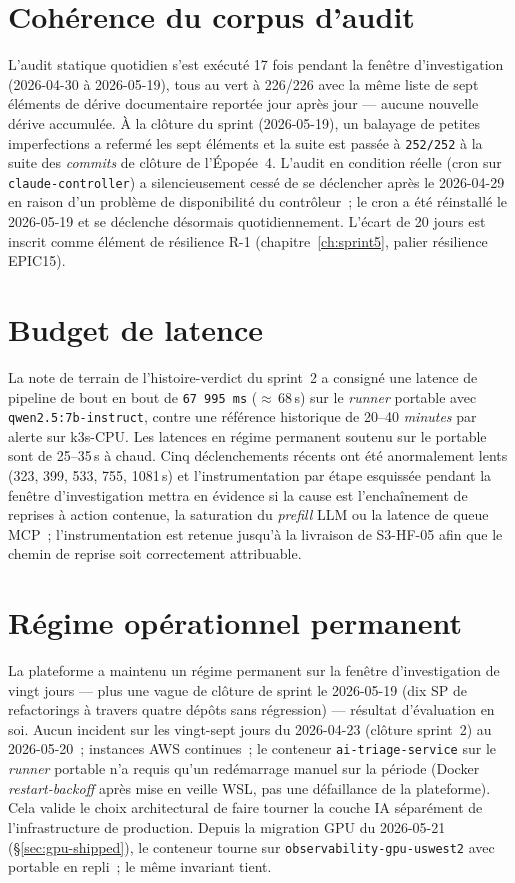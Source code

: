\documentclass[11pt,a4paper,oneside]{report}
\begin{document}
\section{Cohérence du corpus d'audit}

L'audit statique quotidien s'est exécuté 17 fois pendant la fenêtre
d'investigation (2026-04-30 à 2026-05-19), tous au vert à 226/226
avec la même liste de sept éléments de dérive documentaire
reportée jour après jour --- aucune nouvelle dérive accumulée. À la
clôture du sprint (2026-05-19), un balayage de petites
imperfections a refermé les sept éléments et la suite est passée à
\texttt{252/252} à la suite des \emph{commits} de clôture de
l'Épopée~4. L'audit en condition réelle (cron sur
\texttt{claude-controller}) a silencieusement cessé de se déclencher
après le 2026-04-29 en raison d'un problème de disponibilité du
contrôleur~; le cron a été réinstallé le 2026-05-19 et se déclenche
désormais quotidiennement. L'écart de 20 jours est inscrit comme
élément de résilience R-1 (chapitre~\ref{ch:sprint5}, palier
résilience EPIC15).

\section{Budget de latence}

La note de terrain de l'histoire-verdict du sprint~2 a consigné une
latence de pipeline de bout en bout de \texttt{67\,995\,ms}
($\approx$\,68\,s) sur le \emph{runner} portable avec
\texttt{qwen2.5:7b-instruct}, contre une référence historique de
20--40 \emph{minutes} par alerte sur k3s-CPU. Les latences en
régime permanent soutenu sur le portable sont de 25--35\,s à chaud.
Cinq déclenchements récents ont été anormalement lents (323, 399,
533, 755, 1081\,s) et l'instrumentation par étape esquissée
pendant la fenêtre d'investigation mettra en évidence si la cause
est l'enchaînement de reprises à action contenue, la saturation du
\emph{prefill} LLM ou la latence de queue MCP~; l'instrumentation
est retenue jusqu'à la livraison de S3-HF-05 afin que le chemin de
reprise soit correctement attribuable.

\section{Régime opérationnel permanent}

La plateforme a maintenu un régime permanent sur la fenêtre
d'investigation de vingt jours --- plus une vague de clôture de
sprint le 2026-05-19 (dix SP de refactorings à travers quatre
dépôts sans régression) --- résultat d'évaluation en soi. Aucun
incident sur les vingt-sept jours du 2026-04-23 (clôture sprint~2)
au 2026-05-20~; instances AWS continues~; le conteneur
\texttt{ai-triage-service} sur le \emph{runner} portable n'a requis
qu'un redémarrage manuel sur la période (Docker
\emph{restart-backoff} après mise en veille WSL, pas une
défaillance de la plateforme). Cela valide le choix architectural
de faire tourner la couche IA séparément de l'infrastructure de
production. Depuis la migration GPU du 2026-05-21
(\S\ref{sec:gpu-shipped}), le conteneur tourne sur
\texttt{observability-gpu-uswest2} avec portable en repli~; le
même invariant tient.
\end{document}
